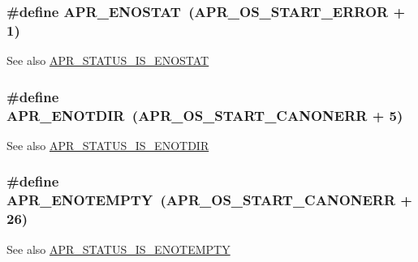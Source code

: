 \subsubsection[{\texorpdfstring{A\+P\+R\+\_\+\+E\+N\+O\+S\+T\+AT}{APR_ENOSTAT}}]{\setlength{\rightskip}{0pt plus 5cm}\#define A\+P\+R\+\_\+\+E\+N\+O\+S\+T\+AT~({\bf A\+P\+R\+\_\+\+O\+S\+\_\+\+S\+T\+A\+R\+T\+\_\+\+E\+R\+R\+OR} + 1)}\hypertarget{group___a_p_r___error_ga7995805cf68be1fb16f684c544e45fbe}{}\label{group___a_p_r___error_ga7995805cf68be1fb16f684c544e45fbe}
\begin{DoxySeeAlso}{See also}
\hyperlink{group___a_p_r___s_t_a_t_u_s___i_s_ga0cb15725cd4f48f474688c601114d447}{A\+P\+R\+\_\+\+S\+T\+A\+T\+U\+S\+\_\+\+I\+S\+\_\+\+E\+N\+O\+S\+T\+AT} 
\end{DoxySeeAlso}
\subsubsection[{\texorpdfstring{A\+P\+R\+\_\+\+E\+N\+O\+T\+D\+IR}{APR_ENOTDIR}}]{\setlength{\rightskip}{0pt plus 5cm}\#define A\+P\+R\+\_\+\+E\+N\+O\+T\+D\+IR~({\bf A\+P\+R\+\_\+\+O\+S\+\_\+\+S\+T\+A\+R\+T\+\_\+\+C\+A\+N\+O\+N\+E\+RR} + 5)}\hypertarget{group___a_p_r___error_gacfaa73cea75d14d49cc5c81e6c494330}{}\label{group___a_p_r___error_gacfaa73cea75d14d49cc5c81e6c494330}
\begin{DoxySeeAlso}{See also}
\hyperlink{group___a_p_r___s_t_a_t_u_s___i_s_gae81f5d74c2051f410aaf4203a363a595}{A\+P\+R\+\_\+\+S\+T\+A\+T\+U\+S\+\_\+\+I\+S\+\_\+\+E\+N\+O\+T\+D\+IR} 
\end{DoxySeeAlso}
\subsubsection[{\texorpdfstring{A\+P\+R\+\_\+\+E\+N\+O\+T\+E\+M\+P\+TY}{APR_ENOTEMPTY}}]{\setlength{\rightskip}{0pt plus 5cm}\#define A\+P\+R\+\_\+\+E\+N\+O\+T\+E\+M\+P\+TY~({\bf A\+P\+R\+\_\+\+O\+S\+\_\+\+S\+T\+A\+R\+T\+\_\+\+C\+A\+N\+O\+N\+E\+RR} + 26)}\hypertarget{group___a_p_r___error_ga01d9259eccdf0576f58b89c4ad8ca4eb}{}\label{group___a_p_r___error_ga01d9259eccdf0576f58b89c4ad8ca4eb}
\begin{DoxySeeAlso}{See also}
\hyperlink{group___a_p_r___s_t_a_t_u_s___i_s_gabe21b829c647616e0809613b7bd38ce3}{A\+P\+R\+\_\+\+S\+T\+A\+T\+U\+S\+\_\+\+I\+S\+\_\+\+E\+N\+O\+T\+E\+M\+P\+TY} 
\end{DoxySeeAlso}
